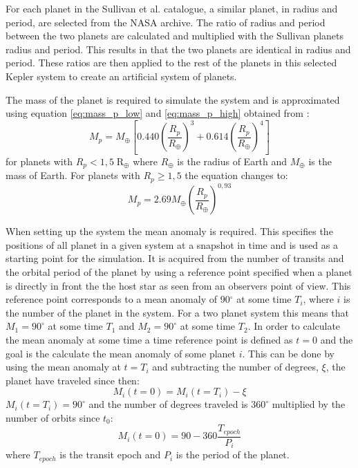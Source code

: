 \documentclass[12pt]{report}
\begin{document}
	For each planet in the Sullivan et al. catalogue, a similar planet, in radius and period, are selected from the NASA archive. The ratio of radius and period between the two planets are calculated and multiplied with the Sullivan planets radius and period. This results in that the two planets are identical in radius and period. These ratios are then applied to the rest of the planets in this selected Kepler system to create an artificial system of planets.  
	
	The mass of the planet is required to simulate the system and is approximated using equation \ref{eq:mass_p_low} and \ref{eq:mass_p_high} obtained from \cite{2015ApJ...809...77S}:
	\begin{equation}
	\label{eq:mass_p_low}
	M_p = M_{\oplus} \left[0.440 \left(\frac{R_p}{R_{\oplus}}\right)^3 + 0.614\left(\frac{R_p}{R_{\oplus}}\right)^4\right]
	\end{equation}
	for planets with $R_p < 1,5 \; \mathrm{R_{\oplus}}$ where $R_{\oplus}$ is the radius of Earth and $M_{\oplus}$ is the mass of Earth. For planets with $R_p \geq 1,5$ the equation changes to:
	\begin{equation}
	\label{eq:mass_p_high}
	M_p = 2.69 M_{\oplus}\left(\frac{R_p}{R_{\oplus}}\right)^{0,93}
	\end{equation}
	
	When setting up the system the mean anomaly is required. This specifies the positions of all planet in a given system at a snapshot in time and is used as a starting point for the simulation. It is acquired from the number of transits and the orbital period of the planet by using a reference point specified when a planet is directly in front the the host star as seen from an observers point of view. This reference point corresponds to a mean anomaly of 90$^{\circ}$ at some time $T_i$, where $i$ is the number of the planet in the system. For a two planet system this means that $M_1=90^{\circ}$ at some time $T_1$ and $M_2=90^{\circ}$ at some time $T_2$. In order to calculate the mean anomaly at some time a time reference point is defined as $t=0$ and the goal is the calculate the mean anomaly of some planet $i$. This can be done by using the mean anomaly at $t = T_i$ and subtracting the number of degrees, $\xi$, the planet have traveled since then:
\begin{equation}
	M_i(t=0) = M_i(t=T_i) - \xi
\end{equation}
	$M_i(t=T_i) = 90^{\circ}$ and the number of degrees traveled is $360^{\circ}$ multiplied by the number of orbits since $t_0$:
\begin{equation}
	M_i(t=0) = 90 - 360 \frac{T_{epoch}}{P_i}
\end{equation}
	where $T_{epoch}$ is the transit epoch and $P_i$ is the period of the planet.
	
\end{document}
